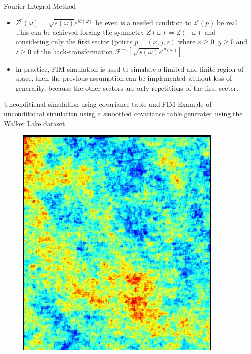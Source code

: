 \begin{frame}{Fourier Integral Method}
  \begin{itemize}
    \item $Z^{r}(\omega) = \sqrt{s(\omega)}e^{i\theta(\omega)}$ be even is a needed condition to $z^{r}(p)$ be real. This can be achieved forcing the symmetry $Z(\omega) = Z(-\omega)$ and considering only the first sector (points $p=(x, y, z)$ where $x \geq 0$, $y \geq 0$ and $z \geq 0$ of the back-transformation $\mathscr{F}^{-1}[\sqrt{s(\omega)}e^{i\theta(\omega)}]$. 
    \item In practice, FIM simulation is used to simulate a limited and finite region of space, then the previous assumption can be implemented without loss of generality, because the other sectors are only repetitions of the first sector. 
  \end{itemize}
\end{frame}

\begin{frame}{Unconditional simulation using covariance table and FIM}
Example of unconditional simulation using a smoothed covariance table generated using the Walker Lake dataset.
\begin{figure}[!ht]
  \centering
    \includegraphics[height=0.5\textheight]{figs/sim_cov_table.png}
    \label{cov_table_sim.fig}
\end{figure}
\end{frame}


